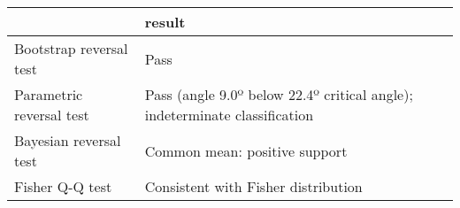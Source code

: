 \begin{tabular}{ll}
\toprule
{} &                                                                      result \\
\midrule
Bootstrap reversal test  &                                                                        Pass \\
Parametric reversal test &  Pass (angle 9.0º below 22.4º critical angle); indeterminate classification \\
Bayesian reversal test   &                                               Common mean: positive support \\
Fisher Q-Q test          &                                         Consistent with Fisher distribution \\
\bottomrule
\end{tabular}
